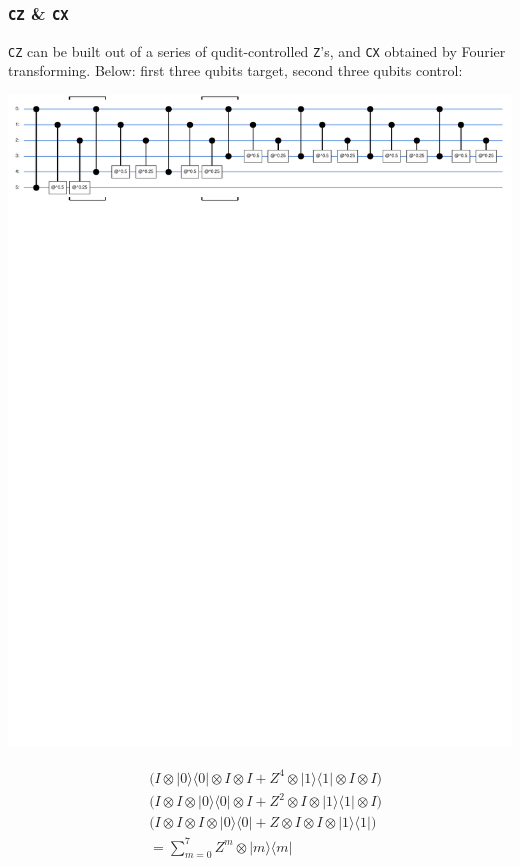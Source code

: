 \documentclass{beamer}
\newcommand{\T}[1]{\texttt{#1}}
\begin{document}
\begin{frame}
\frametitle{\T{CZ} \& \T{CX}}
\T{CZ} can be built out of a series of qudit-controlled \T{Z}'s, and \T{CX} obtained by Fourier transforming. Below: first three qubits target, second three qubits control:
\begin{center}
\includegraphics[scale=0.5]{img/controlled_clock.pdf}
\end{center}	
\begin{align*}
&\Big(I\otimes|0\rangle\langle0|\otimes I\otimes I + Z^4\otimes |1\rangle\langle 1| \otimes I \otimes I\Big)\\
&\Big(I\otimes I\otimes |0\rangle\langle 0| \otimes I+Z^2\otimes I\otimes |1\rangle\langle 1| \otimes I\Big)\\
&\Big(I\otimes I\otimes I\otimes |0\rangle\langle 0|+Z\otimes I\otimes I\otimes |1\rangle\langle 1|\Big)	\\
&=\sum_{m=0}^{7}Z^m \otimes |m\rangle\langle m| 
\end{align*}

\end{frame}
\end{document}
